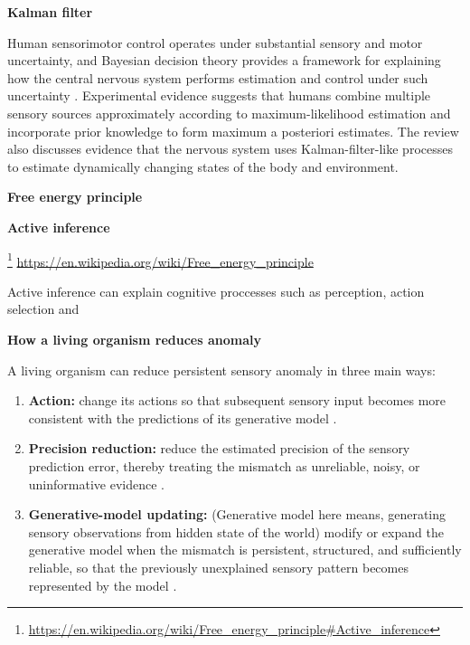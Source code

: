 \documentclass{book}
\providecommand{\ProjectDeepHeading}[2]{%
    \par\medskip\noindent\textbf{#2}\par\smallskip
}
\providecommand{\seeherefooter}[1]{\footnote{\url{#1}}}
\begin{document}
      \ProjectDeepHeading{10}{Kalman filter}
         Human sensorimotor control operates under substantial sensory and motor uncertainty, and Bayesian decision theory provides a framework for explaining how the central nervous system performs estimation and control under such uncertainty \cite{wolpert-2007-probabilistic-models-in-human-sensorimotor-control}. Experimental evidence suggests that humans combine multiple sensory sources approximately according to maximum-likelihood estimation and incorporate prior knowledge to form maximum a posteriori estimates.
         The review also discusses evidence that the nervous system uses Kalman-filter-like processes to estimate dynamically changing states of the body and environment.


\ProjectDeepHeading{7}{Free energy principle}

\ProjectDeepHeading{8}{Active inference}


\seeherefooter{https://en.wikipedia.org/wiki/Free_energy_principle\#Active_inference}
   \url{https://en.wikipedia.org/wiki/Free_energy_principle}

   Active inference can explain cognitive proccesses such as perception, action selection and

   \ProjectDeepHeading{11}{How a living organism reduces anomaly}
      A living organism can reduce persistent sensory anomaly in three main ways:
      \begin{enumerate}
         \item \textbf{Action:} change its actions so that subsequent sensory input becomes more consistent with the predictions of its generative model \cite{friston-2010-action-and-behavior-a-free-energy-formulation}.
         \item \textbf{Precision reduction:} reduce the estimated precision of the sensory prediction error, thereby treating the mismatch as unreliable, noisy, or uninformative evidence \cite{feldman-2010-attention-uncertainty-and-free-energy}.
         \item \textbf{Generative-model updating:} (Generative model here means, generating sensory observations from hidden state of the world) modify or expand the generative model when the mismatch is persistent, structured, and sufficiently reliable, so that the previously unexplained sensory pattern becomes represented by the model \cite{neacsu-2026-reviewing-structure-learning-in-and-out-of-the-active-inference-framework}.
      \end{enumerate}
\end{document}
